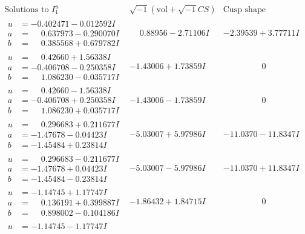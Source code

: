 \documentclass[1p]{elsarticle_modified}
\theoremstyle{definition}
\newcommand{\I}{\sqrt{-1}}
\begin{document}
$$\begin{array}{c|c|c}
\text{Solutions to }I^u_{1}& \I (\text{vol} + \sqrt{-1}CS) & \text{Cusp shape}\\
 \hline 
\begin{aligned}
u &= -0.402471 - 0.012592 I \\
a &= \phantom{-}0.637973 - 0.290070 I \\
b &= \phantom{-}0.385568 + 0.679782 I\end{aligned}
 & \phantom{-}0.88956 - 2.71106 I & -2.39539 + 3.77711 I \\ \hline\begin{aligned}
u &= \phantom{-}0.42660 + 1.56338 I \\
a &= -0.406708 - 0.250358 I \\
b &= \phantom{-}1.086230 - 0.035717 I\end{aligned}
 & -1.43006 + 1.73859 I & \phantom{-0.000000 } 0 \\ \hline\begin{aligned}
u &= \phantom{-}0.42660 - 1.56338 I \\
a &= -0.406708 + 0.250358 I \\
b &= \phantom{-}1.086230 + 0.035717 I\end{aligned}
 & -1.43006 - 1.73859 I & \phantom{-0.000000 } 0 \\ \hline\begin{aligned}
u &= \phantom{-}0.296683 + 0.211677 I \\
a &= -1.47678 - 0.04423 I \\
b &= -1.45484 + 0.23814 I\end{aligned}
 & -5.03007 + 5.97986 I & -11.0370 - 11.8347 I \\ \hline\begin{aligned}
u &= \phantom{-}0.296683 - 0.211677 I \\
a &= -1.47678 + 0.04423 I \\
b &= -1.45484 - 0.23814 I\end{aligned}
 & -5.03007 - 5.97986 I & -11.0370 + 11.8347 I \\ \hline\begin{aligned}
u &= -1.14745 + 1.17747 I \\
a &= \phantom{-}0.136191 + 0.399887 I \\
b &= \phantom{-}0.898002 - 0.104186 I\end{aligned}
 & -1.86432 + 1.84715 I & \phantom{-0.000000 } 0 \\ \hline\begin{aligned}
u &= -1.14745 - 1.17747 I \\

\end{aligned}
\end{array}$$
\end{document}
